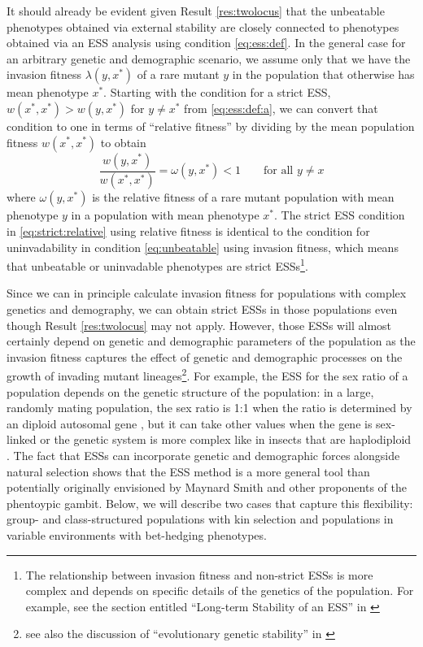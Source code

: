 \documentclass[11pt]{article}
\newcommand{\ess}[1]{#1^*}
\newcommand{\eig}{\lambda}
\begin{document}
It should already be evident given Result \ref{res:twolocus} that the unbeatable phenotypes obtained via external stability are closely connected to phenotypes obtained via an ESS analysis using condition \eqref{eq:ess:def}. In the general case for an arbitrary genetic and demographic scenario, we assume only that we have the invasion fitness $\eig(y, \ess{x})$ of a rare mutant $y$ in the population that otherwise has mean phenotype $\ess{x}$. Starting with the condition for a strict ESS, $w(\ess{x}, \ess{x}) > w(y, \ess{x})$ for $y \ne \ess{x}$ from \eqref{eq:ess:def:a}, we can convert that condition to one in terms of ``relative fitness'' by dividing by the mean population fitness $w(\ess{x}, \ess{x})$ to obtain
\begin{equation}
  \label{eq:strict:relative}
  \frac{w(y, \ess{x})}{w(\ess{x}, \ess{x})} = \omega(y, \ess{x}) < 1 \qquad \text{for all } y \ne x
\end{equation}
where $\omega(y, \ess{x})$ is the relative fitness of a rare mutant population with mean phenotype $y$ in a population with mean phenotype $\ess{x}$. The strict ESS condition in \eqref{eq:strict:relative} using relative fitness is identical to the condition for uninvadability in condition \eqref{eq:unbeatable} using invasion fitness, which means that unbeatable or uninvadable phenotypes are strict ESSs\footnote{The relationship between invasion fitness and non-strict ESSs is more complex and depends on specific details of the genetics of the population. For example, see the section entitled ``Long-term Stability of an ESS'' in \cite{Eshel:Feldman:1998}}.

Since we can in principle calculate invasion fitness for populations with complex genetics and demography, we can obtain strict ESSs in those populations even though Result \ref{res:twolocus} may not apply. However, those ESSs will almost certainly depend on genetic and demographic parameters of the population as the invasion fitness captures the effect of genetic and demographic processes on the growth of invading mutant lineages\footnote{see also the discussion of ``evolutionary genetic stability'' in \cite[pp. 505--506]{Eshel:1996}}. For example, the ESS for the sex ratio of a population depends on the genetic structure of the population: in a large, randomly mating population, the sex ratio is 1:1 when the ratio is determined by an diploid autosomal gene \cite{Fisher:1958,Hamilton:1967,Eshel:Feldman:1982}, but it can take other values when the gene is sex-linked or the genetic system is more complex like in insects that are haplodiploid \cite{Hamilton:1967,Eshel:Feldman:1982a}. The fact that ESSs can incorporate genetic and demographic forces alongside natural selection shows that the ESS method is a more general tool than potentially originally envisioned by Maynard Smith and other proponents of the phentoypic gambit. Below, we will describe two cases that capture this flexibility: group- and class-structured populations with kin selection and populations in variable environments with bet-hedging phenotypes.
\end{document}

